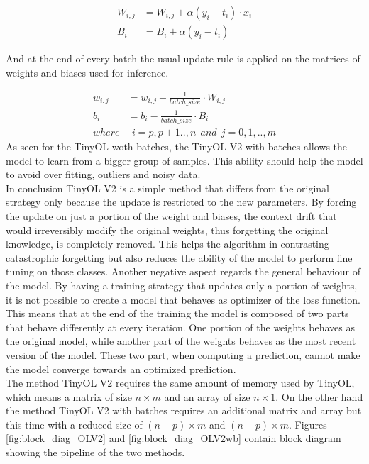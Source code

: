 \documentclass[12pt]{report}
\begin{document}
\begin{align}
    W_{i,j} &= W_{i,j} + \alpha (y_i - t_i) \cdot x_i \\
    B_i     &= B_i + \alpha  (y_i - t_i) 
\end{align}

And at the end of every batch the usual update rule is applied on the matrices of weights and biases used for inference.

\begin{align}
    w_{i,j} &= w_{i,j} - \frac{1}{batch\_size} \cdot W_{i,j} \\
    b_i 	    &= b_i - \frac{1}{batch\_size} \cdot B_i \\
    where   & \: \: i= p,p+1..,n  \: \: and \: \:  j=0,1,..,m \nonumber  
\end{align}
As seen for the TinyOL woth batches, the TinyOL V2 with batches allows the model to learn from a bigger group of samples. This ability should help the model to avoid over fitting, outliers and noisy data. \\
In conclusion TinyOL V2 is a simple method that differs from the original strategy only because the update is restricted to the new parameters. By forcing the update on just a portion of the weight and biases, the context drift that would irreversibly modify the original weights, thus forgetting the original knowledge, is completely removed. This helps the algorithm in contrasting catastrophic forgetting but also reduces the ability of the model to perform fine tuning on those classes. Another negative aspect regards the general behaviour of the model. By having a training strategy that updates only a portion of weights, it is not possible to create a model that behaves as optimizer of the loss function. This means that at the end of the training the model is composed of two parts that behave differently at every iteration. One portion of the weights behaves as the original model, while another part of the weights behaves as the most recent version of the model. These two part, when computing a prediction, cannot make the model converge towards an optimized prediction. \\
The method TinyOL V2 requires the same amount of memory used by TinyOL, which means a matrix of size $n \times m$ and an array of size $n \times 1$. On the other hand the method TinyOL V2 with batches requires an additional matrix and array but this time with a reduced size of $(n-p) \times m$ and $(n-p) \times m$. Figures \ref{fig:block_diag_OLV2} and \ref{fig:block_diag_OLV2wb} contain block diagram showing the pipeline of the two methods.
\end{document}
